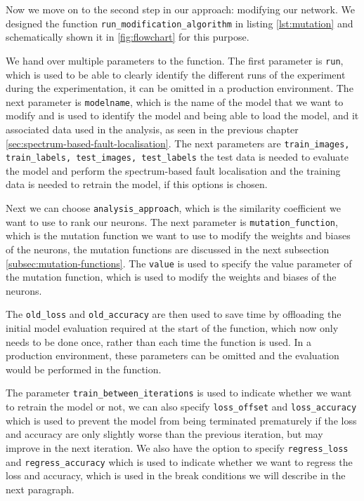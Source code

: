 Now we move on to the second step in our approach: modifying our network.
We designed the function \texttt{run\_modification\_algorithm} in listing \ref{lst:mutation} and schematically shown it in \ref{fig:flowchart} for this purpose.

We hand over multiple parameters to the function.
The first parameter is \texttt{run}, which is used to be able to clearly identify the different runs of the experiment during the experimentation, it can be omitted in a production environment.
The next parameter is \texttt{modelname}, which is the name of the model that we want to modify and is used to identify the model and being able to load the model, and it associated data used in the analysis, as seen in the previous chapter \ref{sec:spectrum-based-fault-localisation}.
The next parameters are \texttt{train\_images, train\_labels, test\_images, test\_labels} the test data is needed to evaluate the model and perform the spectrum-based fault localisation and the training data is needed to retrain the model, if this options is chosen.

Next we can choose \texttt{analysis\_approach}, which is the similarity coefficient we want to use to rank our neurons.
The next parameter is \texttt{mutation\_function}, which is the mutation function we want to use to modify the weights and biases of the neurons, the mutation functions are discussed in the next subsection \ref{subsec:mutation-functions}.
The \texttt{value} is used to specify the value parameter of the mutation function, which is used to modify the weights and biases of the neurons.

The \texttt{old\_loss} and \texttt{old\_accuracy} are then used to save time by offloading the initial model evaluation required at the start of the function, which now only needs to be done once, rather than each time the function is used.
In a production environment, these parameters can be omitted and the evaluation would be performed in the function.

The parameter \texttt{train\_between\_iterations} is used to indicate whether we want to retrain the model or not, we can also specify \texttt{loss\_offset} and \texttt{loss\_accuracy} which is used to prevent the model from being terminated prematurely if the loss and accuracy are only slightly worse than the previous iteration, but may improve in the next iteration.
We also have the option to specify \texttt{regress\_loss} and \texttt{regress\_accuracy} which is used to indicate whether we want to regress the loss and accuracy, which is used in the break conditions we will describe in the next paragraph.

